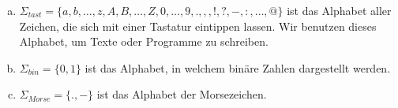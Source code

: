 %
%
\begin{enumerate}[(a)]
    \item \(\Sigma_{tast} = \{a, b, \dots, z, A, B, \dots, Z, 0, \dots, 9, ., ,, !, ?, -, :, \dots, @\}\) ist das Alphabet aller Zeichen, die sich mit einer Tastatur eintippen lassen. Wir benutzen dieses Alphabet, um Texte oder Programme zu schreiben.
    \item \(\Sigma_{bin} = \{0, 1\}\) ist das Alphabet, in welchem binäre Zahlen dargestellt werden.
    \item \(\Sigma_{Morse} = \{.,-\}\) ist das Alphabet der Morsezeichen.
\end{enumerate}

